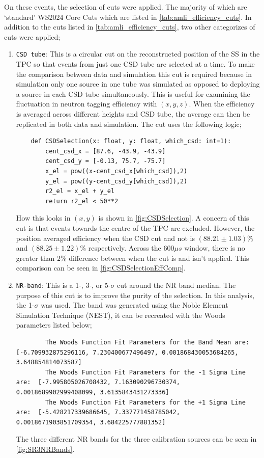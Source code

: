 On these events, the selection of cuts were applied.
The majority of which are `standard' WS2024 Core Cuts which are listed in \autoref{tab:amli_efficiency_cuts}.
In addition to the cuts listed in \autoref{tab:amli_efficiency_cuts}, two other categorizes of cuts were applied;
\begin{enumerate}
	\item \lstinline{CSD tube}: This is a circular cut on the reconstructed position of the SS in the TPC so that events from just one CSD tube are selected at a time.
	To make the comparison between data and simulation this cut is required because in simulation only one source in one tube was simulated as opposed to deploying a source in each CSD tube simultaneously.
	This is useful for examining the fluctuation in neutron tagging efficiency with $(x,y,z)$.
	When the efficiency is averaged across different heights and CSD tube, the average can then be replicated in both data and simulation. The cut uses the following logic;
	      \begin{lstlisting}
    def CSDSelection(x: float, y: float, which_csd: int=1):
        cent_csd_x = [87.6, -43.9, -43.9]
        cent_csd_y = [-0.13, 75.7, -75.7]
        x_el = pow((x-cent_csd_x[which_csd]),2)
        y_el = pow((y-cent_csd_y[which_csd]),2)
        r2_el = x_el + y_el
        return r2_el < 50**2 
    \end{lstlisting}
	      How this looks in $(x,y)$ is shown in \autoref{fig:CSDSelection}.
	      A concern of this cut is that events towards the centre of the TPC are excluded.
	      However, the position averaged efficiency when the CSD cut and not is $(88.21\pm1.03)\%$ and  $(88.25\pm1.22)\%$ respectively.
	      Across the $600\mu s$ window, there is no greater than $2\%$ difference between when the cut is and isn't applied.
	      This comparison can be seen in \autoref{fig:CSDSelectionEffComp}.
	\item \lstinline{NR-band}: This is a 1-, 3-, or 5-$\sigma$ cut around the NR band median.
	      The purpose of this cut is to improve the purity of the selection.
	      In this analysis, the 1-$\sigma$ was used.
		  The band was generated using the Noble Element Simulation Technique (NEST), it can be recreated with the Woods parameters listed below;
	      \begin{lstlisting}
        The Woods Function Fit Parameters for the Band Mean are:  [-6.709932875296116, 7.230400677496497, 0.001868430053684265, 3.648854814073587]
        The Woods Function Fit Parameters for the -1 Sigma Line are:  [-7.995805026708432, 7.163090296730374, 0.0018689902999408099, 3.6135843431273336]
        The Woods Function Fit Parameters for the +1 Sigma Line are:  [-5.428217339686645, 7.337771458785042, 0.0018671903851709354, 3.684225777881352]
    \end{lstlisting}
	      The three different NR bands for the three calibration sources can be seen in \autoref{fig:SR3NRBands}.
\end{enumerate}

